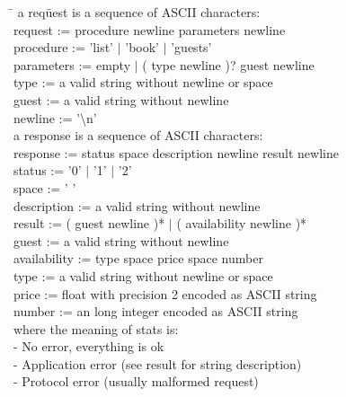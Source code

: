 \documentclass[a4paper,10pt]{article}
\begin{document}
\begin{tabbing}
\hspace{20pt}\=\kill
 \> a req\=uest is a sequence of ASCII characters: \+\\ 
 \> request := procedure newline parameters newline\\
 \> procedure := 'list' $\vert$ 'book' $\vert$ 'guests'\\
 \> parameters := empty $\vert$ ( type newline )? guest newline\\
 \> type := a valid string without newline or space\\ 
 \> guest := a valid string without newline\\
 \> newline := '\textbackslash n' \-\\ 
 \> a response is a sequence of ASCII characters:\+ \\
 \> response := status space description newline result newline \\
 \> status := '0' $\vert$ '1' $\vert$ '2'\\
 \> space := ' '\\
 \> description := a valid string without newline\\
 \> result := ( guest newline )* $\vert$ ( availability newline )*\\
 \> guest := a valid string without newline\\
 \> availability := type space price space number\\
 \> type := a valid string without newline or space\\
 \> price := float with precision 2 encoded as ASCII string\\
 \> number := an long integer encoded as ASCII string \-\\
 \> where the meaning of stats is: \+\\
  - No error, everything is ok\\
  - Application error (see result for string description)\\
  - Protocol error (usually malformed request)\\
\end{tabbing}
\end{document}
